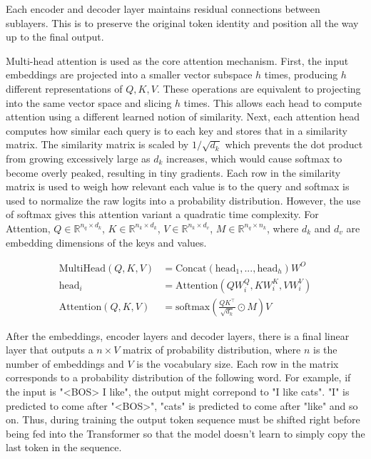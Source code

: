\documentclass{article}
\begin{document}
Each encoder and decoder layer maintains residual connections between sublayers. This is to preserve the original token identity and position all the way up to the final output.

Multi-head attention is used as the core attention mechanism. First, the input embeddings are projected into a smaller vector subspace $h$ times, producing $h$ different representations of $Q, K, V$. These operations are equivalent to projecting into the same vector space and slicing $h$ times. This allows each head to compute attention using a different learned notion of similarity. Next, each attention head computes how similar each query is to each key and stores that in a similarity matrix. The similarity matrix is scaled by $1 / \sqrt{d_k}$ which prevents the dot product from growing excessively large as $d_k$ increases, which would cause softmax to become overly peaked, resulting in tiny gradients. Each row in the similarity matrix is used to weigh how relevant each value is to the query and softmax is used to normalize the raw logits into a probability distribution. However, the use of softmax gives this attention variant a quadratic time complexity. For Attention, $Q \in \mathbb{R}^{n_q \times d_k}$, $K \in \mathbb{R}^{n_k \times d_k}$, $V \in \mathbb{R}^{n_k \times d_v}$, $M \in \mathbb{R}^{n_q \times n_k}$, where $d_k$ and $d_v$ are embedding dimensions of the keys and values.

\begin{align*}
\text{MultiHead}(Q, K, V) &= \text{Concat} \left( \text{head}_1, ..., \text{head}_h \right) W^O \\
\text{head}_i &= \text{Attention}(Q W_i^Q, K W_i^K, V W_{i}^V) \\
\text{Attention}(Q, K, V) &= \text{softmax} \left( \frac{Q K^{\top}}{\sqrt{d_k}} \odot M \right) V
\end{align*}

After the embeddings, encoder layers and decoder layers, there is a final linear layer that outputs a $n \times V$ matrix of probability distribution, where $n$ is the number of embeddings and $V$ is the vocabulary size. Each row in the matrix corresponds to a probability distribution of the following word. For example, if the input is "<BOS> I like", the output might correpond to "I like cats". "I" is predicted to come after "<BOS>", "cats" is predicted to come after "like" and so on. Thus, during training the output token sequence must be shifted right before being fed into the Transformer so that the model doesn't learn to simply copy the last token in the sequence.
\end{document}
